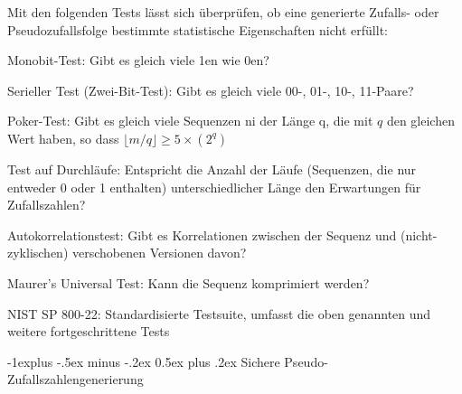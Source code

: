 \documentclass[a4paper]{article}
\makeatletter
\renewcommand{\subsection}{\@startsection{subsection}{2}{0mm}%
 {-1explus -.5ex minus -.2ex}%
 {0.5ex plus .2ex}%
 {\normalfont\normalsize\bfseries}}
\makeatother
\begin{document}
\begin{multicols}{3}
      \begin{itemize*}
            \item Mit den folgenden Tests lässt sich überprüfen, ob eine generierte
            Zufalls- oder Pseudozufallsfolge bestimmte statistische Eigenschaften
            nicht erfüllt:
            \begin{itemize*}
                  \item Monobit-Test: Gibt es gleich viele 1en wie 0en?
                  \item Serieller Test (Zwei-Bit-Test): Gibt es gleich viele 00-, 01-, 10-, 11-Paare?
                  \item Poker-Test: Gibt es gleich viele Sequenzen ni der Länge q, die mit $q$ den gleichen Wert haben, so dass $\lfloor m/q\rfloor\geq 5\times (2^q)$
                  \item Test auf Durchläufe: Entspricht die Anzahl der Läufe (Sequenzen, die nur entweder 0 oder 1 enthalten) unterschiedlicher Länge den Erwartungen für Zufallszahlen?
                  \item Autokorrelationstest: Gibt es Korrelationen zwischen der Sequenz und (nicht-zyklischen) verschobenen Versionen davon?
                  \item Maurer's Universal Test: Kann die Sequenz komprimiert werden?
                  \item NIST SP 800-22: Standardisierte Testsuite, umfasst die oben genannten und weitere fortgeschrittene Tests
            \end{itemize*}
      \end{itemize*}


      \subsection{Sichere
            Pseudo-Zufallszahlengenerierung}


\end{multicols}
\end{document}
